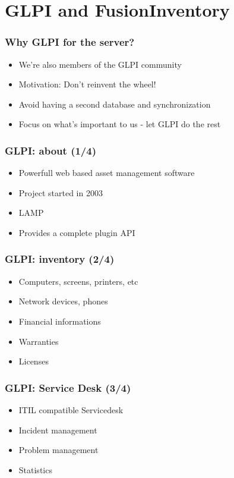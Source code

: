 \documentclass{beamer}
\begin{document}
\section{GLPI and FusionInventory}

\begin{frame}
    \frametitle{Why GLPI for the server?}

    \begin{itemize}
    \item We're also members of the GLPI community
    \item Motivation: Don't reinvent the wheel!
    \item Avoid having a second database and synchronization
    \item Focus on what's important to us - let GLPI do the rest
    \end{itemize}
\end{frame}

\begin{frame}
    \frametitle{GLPI: about (1/4)}

    \begin{itemize}
    \item Powerfull web based asset management software
    \item Project started in 2003
    \item LAMP
    \item Provides a complete plugin API
    \end{itemize}
\end{frame}

\begin{frame}
    \frametitle{GLPI: inventory (2/4)}

    \begin{itemize}
    \item Computers, screens, printers, etc
    \item Network devices, phones
    \item Financial informations
    \item Warranties
    \item Licenses
    \end{itemize}
\end{frame}

\begin{frame}
    \frametitle{GLPI: Service Desk (3/4)}

    \begin{itemize}
    \item ITIL compatible Servicedesk
    \item Incident management
    \item Problem management
    \item Statistics
    \end{itemize}
\end{frame}
\end{document}
